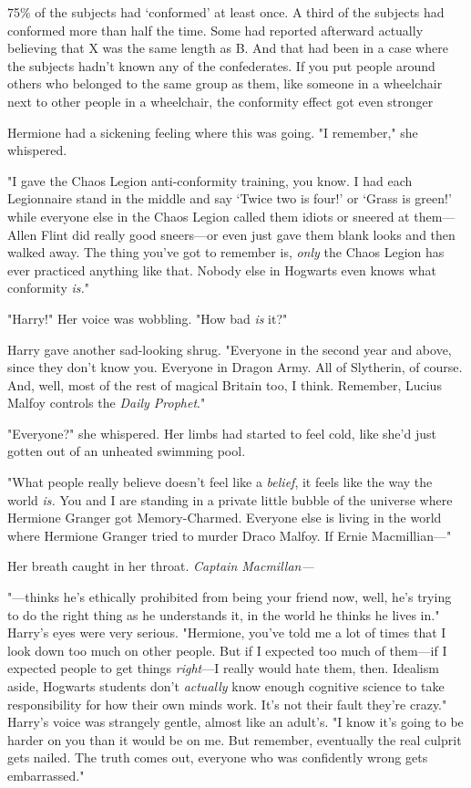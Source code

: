 75\% of the subjects had `conformed' at least once. A third of the subjects had
conformed more than half the time. Some had reported afterward actually
believing that X was the same length as B. And that had been in a case where
the subjects hadn't known any of the confederates. If you put people around
others who belonged to the same group as them, like someone in a wheelchair
next to other people in a wheelchair, the conformity effect got even
stronger{\el}

Hermione had a sickening feeling where this was going. "I remember," she
whispered.

"I gave the Chaos Legion anti-conformity training, you know. I had each
Legionnaire stand in the middle and say `Twice two is four!' or `Grass is
green!' while everyone else in the Chaos Legion called them idiots or sneered
at them---Allen Flint did really good sneers---or even just gave them blank
looks and then walked away. The thing you've got to remember is, \emph{only}
the Chaos Legion has ever practiced anything like that. Nobody else in Hogwarts
even knows what conformity \emph{is.}"

"Harry!" Her voice was wobbling. "How bad \emph{is} it?"

Harry gave another sad-looking shrug. "Everyone in the second year and above,
since they don't know you. Everyone in Dragon Army. All of Slytherin, of
course. And, well, most of the rest of magical Britain too, I think. Remember,
Lucius Malfoy controls the \emph{Daily Prophet}."

"Everyone?" she whispered. Her limbs had started to feel cold, like she'd just
gotten out of an unheated swimming pool.

"What people really believe doesn't feel like a \emph{belief}, it feels like
the way the world \emph{is.} You and I are standing in a private little bubble
of the universe where Hermione Granger got Memory-Charmed. Everyone else is
living in the world where Hermione Granger tried to murder Draco Malfoy. If
Ernie Macmillian\mbox{---}"

Her breath caught in her throat. \emph{Captain Macmillan---}

"---thinks he's ethically prohibited from being your friend now, well, he's
trying to do the right thing as he understands it, in the world he thinks he
lives in." Harry's eyes were very serious. "Hermione, you've told me a lot of
times that I look down too much on other people. But if I expected too much of
them---if I expected people to get things \emph{right}---I really would hate
them, then. Idealism aside, Hogwarts students don't \emph{actually} know enough
cognitive science to take responsibility for how their own minds work. It's not
their fault they're crazy." Harry's voice was strangely gentle, almost like an
adult's. "I know it's going to be harder on you than it would be on me. But
remember, eventually the real culprit gets nailed. The truth comes out,
everyone who was confidently wrong gets embarrassed."

